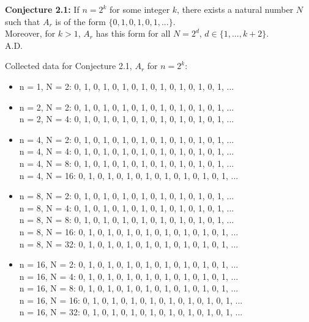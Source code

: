 \documentclass{article}
\begin{document}
\begin{flushleft}
\vspace{.1in}

{\bf Conjecture 2.1:} If $n=2^k$ for some integer $k$, there exists a natural number $N$ such that $A_r$ is of the form $\{0,1,0,1,0,1,...\}$. \\
Moreover, for $k>1$, $A_r$ has this form for all $N=2^d$, $d\in\{1,...,k+2\}$. \\
    \hspace{4.3in} A.D.

    Collected data for Conjecture 2.1, $A_r$ for $n=2^k$:
    \begin{itemize}
        \item n = 1, N = 2:  0, 1, 0, 1, 0, 1, 0, 1, 0, 1, 0, 1, 0, 1, 0, 1, ...
        \item n = 2, N = 2:  0, 1, 0, 1, 0, 1, 0, 1, 0, 1, 0, 1, 0, 1, 0, 1, ...
            \\ n = 2, N = 4:  0, 1, 0, 1, 0, 1, 0, 1, 0, 1, 0, 1, 0, 1, 0, 1, ...
        \item n = 4, N = 2:  0, 1, 0, 1, 0, 1, 0, 1, 0, 1, 0, 1, 0, 1, 0, 1, ...
            \\ n = 4, N = 4:  0, 1, 0, 1, 0, 1, 0, 1, 0, 1, 0, 1, 0, 1, 0, 1, ...
            \\ n = 4, N = 8:  0, 1, 0, 1, 0, 1, 0, 1, 0, 1, 0, 1, 0, 1, 0, 1, ...
            \\ n = 4, N = 16:  0, 1, 0, 1, 0, 1, 0, 1, 0, 1, 0, 1, 0, 1, 0, 1, ...
        \item n = 8, N = 2:  0, 1, 0, 1, 0, 1, 0, 1, 0, 1, 0, 1, 0, 1, 0, 1, ...
            \\ n = 8, N = 4:  0, 1, 0, 1, 0, 1, 0, 1, 0, 1, 0, 1, 0, 1, 0, 1, ...
            \\ n = 8, N = 8:  0, 1, 0, 1, 0, 1, 0, 1, 0, 1, 0, 1, 0, 1, 0, 1, ...
            \\ n = 8, N = 16:  0, 1, 0, 1, 0, 1, 0, 1, 0, 1, 0, 1, 0, 1, 0, 1, ...
            \\ n = 8, N = 32:  0, 1, 0, 1, 0, 1, 0, 1, 0, 1, 0, 1, 0, 1, 0, 1, ...
        \item n = 16, N = 2:  0, 1, 0, 1, 0, 1, 0, 1, 0, 1, 0, 1, 0, 1, 0, 1, ...
            \\ n = 16, N = 4:  0, 1, 0, 1, 0, 1, 0, 1, 0, 1, 0, 1, 0, 1, 0, 1, ...
            \\ n = 16, N = 8:  0, 1, 0, 1, 0, 1, 0, 1, 0, 1, 0, 1, 0, 1, 0, 1, ...
            \\ n = 16, N = 16:  0, 1, 0, 1, 0, 1, 0, 1, 0, 1, 0, 1, 0, 1, 0, 1, ...
            \\ n = 16, N = 32:  0, 1, 0, 1, 0, 1, 0, 1, 0, 1, 0, 1, 0, 1, 0, 1, ...

\end{itemize}
\end{flushleft}
\end{document}
